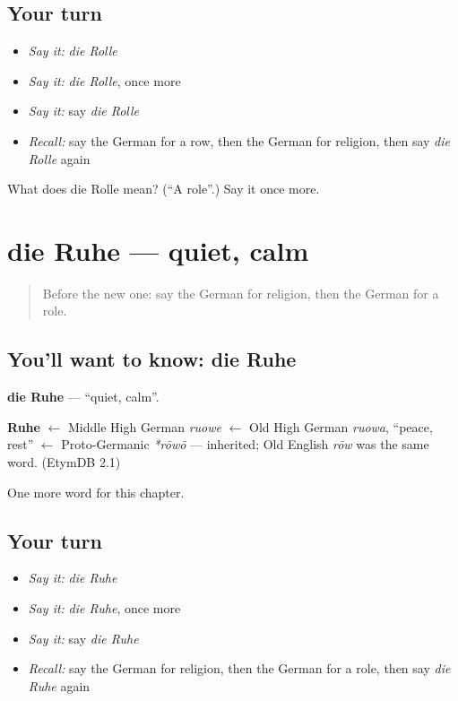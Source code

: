 \subsection*{Your turn}
\begin{itemize}
\raggedright
  \item \emph{Say it:} \emph{die Rolle}
  \item \emph{Say it:} \emph{die Rolle}, once more
  \item \emph{Say it:} say \emph{die Rolle}
  \item \emph{Recall:} say the German for a row, then the German for religion, then say \emph{die Rolle} again
\end{itemize}

\begin{tcolorbox}[breakable,colback=teal!4,colframe=teal!35!black,title={Before you move on}]
What does die Rolle mean? (\textquotedblleft{}A role\textquotedblright{}.) Say it once more.
\end{tcolorbox}
\section[die Ruhe]{die Ruhe — quiet, calm}

\label{lesson:GE-C237-ruhe}



\begin{quote}
Before the new one: say the German for religion, then the German for a role.
\end{quote}

\subsection*{You'll want to know: die Ruhe}
\textbf{die Ruhe} — \textquotedblleft{}quiet, calm\textquotedblright{}.

\begin{cousinweb}
\textbf{Ruhe} $\leftarrow$ Middle High German \emph{ruowe} $\leftarrow$ Old High German \emph{ruowa}, \textquotedblleft{}peace, rest\textquotedblright{} $\leftarrow$ Proto-Germanic \emph{*rōwō} — inherited; Old English \emph{rōw} was the same word. (EtymDB 2.1)
\end{cousinweb}

\begin{grammarlens}[title={What you've built}]
One more word for this chapter.
\end{grammarlens}

\subsection*{Your turn}
\begin{itemize}
\raggedright
  \item \emph{Say it:} \emph{die Ruhe}
  \item \emph{Say it:} \emph{die Ruhe}, once more
  \item \emph{Say it:} say \emph{die Ruhe}
  \item \emph{Recall:} say the German for religion, then the German for a role, then say \emph{die Ruhe} again
\end{itemize}

